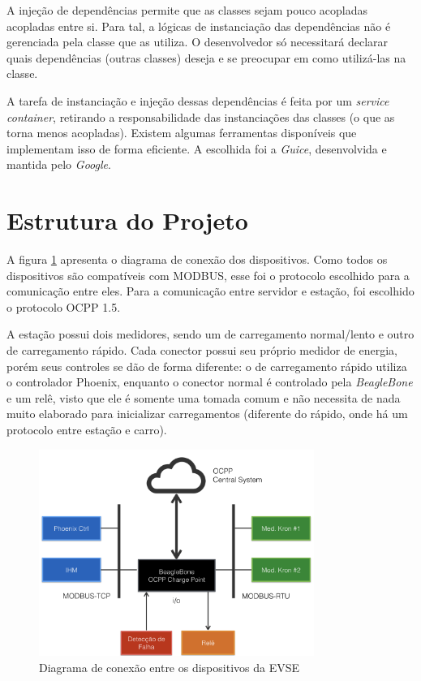       A injeção de dependências permite que as classes sejam pouco acopladas acopladas entre si. Para tal, a lógicas de instanciação das dependências não é gerenciada pela classe que as utiliza. O desenvolvedor só necessitará declarar quais dependências (outras classes) deseja e se preocupar em como utilizá-las na classe.

      A tarefa de instanciação e injeção dessas dependências é feita por um \textit{service container}, retirando a responsabilidade das instanciações das classes (o que as torna menos acopladas). Existem algumas ferramentas disponíveis que implementam isso de forma eficiente. A escolhida foi a \textit{Guice}, desenvolvida e mantida pelo \textit{Google}.

  \section{Estrutura do Projeto}

    A figura \ref{fig:proj-diagram} apresenta o diagrama de conexão dos dispositivos. Como todos os dispositivos são compatíveis com MODBUS, esse foi o protocolo escolhido para a comunicação entre eles. Para a comunicação entre servidor e estação, foi escolhido o protocolo \ac{OCPP} 1.5.

    A estação possui dois medidores, sendo um de carregamento normal/lento e outro de carregamento rápido. Cada conector possui seu próprio medidor de energia, porém seus controles se dão de forma diferente: o de carregamento rápido utiliza o controlador Phoenix, enquanto o conector normal é controlado pela \textit{BeagleBone} e um relê, visto que ele é somente uma tomada comum e não necessita de nada muito elaborado para inicializar carregamentos (diferente do rápido, onde há um protocolo entre estação e carro).

    \begin{figure}[H]
      \begin{center}
        \includegraphics[width=0.8\textwidth,natwidth=400,natheight=288]{assets/images/devices-diagram.png}
        \caption{Diagrama de conexão entre os dispositivos da \ac{EVSE}}
        \label{fig:proj-diagram}
      \end{center}
    \end{figure}


